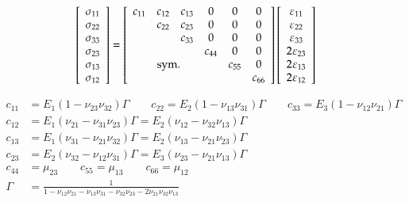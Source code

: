 \begin{align}
  \left[\begin{array}{c}
      \sigma_{11}\\
      \sigma_{22}\\
      \sigma_{33}\\
      \sigma_{23}\\
      \sigma_{13}\\
      \sigma_{12}\\
    \end{array}\right]
  &= \left[
    \begin{array}{cccccc}
      c_{11} & c_{12} & c_{13} &   0   &   0   &   0  \\
            & c_{22} & c_{23} &   0   &   0   &   0  \\
            &       & c_{33} &   0   &   0   &   0  \\
            &       &       & c_{44} &   0   &   0  \\
            &  \multicolumn{2}{l}{\text{sym.}}       &       & c_{55} &   0  \\
            &       &       &       &       & c_{66}\\
    \end{array}\right]
  \left[\begin{array}{c}
      \varepsilon_{11}\\
      \varepsilon_{22}\\
      \varepsilon_{33}\\
      2\varepsilon_{23}\\
      2\varepsilon_{13}\\
      2\varepsilon_{12}\\
    \end{array}\right]
\end{align}

\begin{align}
  c_{11} &= E_1 (1 - \nu_{23}\nu_{32})\Gamma \qquad c_{22} = E_2 (1 - \nu_{13}\nu_{31})\Gamma \qquad c_{33} = E_3 (1 - \nu_{12}\nu_{21})\Gamma\\
  c_{12} &= E_1 (\nu_{21} - \nu_{31}\nu_{23})\Gamma = E_2 (\nu_{12} - \nu_{32}\nu_{13})\Gamma\\
  c_{13} &= E_1 (\nu_{31} - \nu_{21}\nu_{32})\Gamma = E_2 (\nu_{13} - \nu_{21}\nu_{23})\Gamma\\
  c_{23} &= E_2 (\nu_{32} - \nu_{12}\nu_{31})\Gamma = E_3 (\nu_{23} - \nu_{21}\nu_{13})\Gamma\\
  c_{44} &= \mu_{23} \qquad  c_{55} = \mu_{13} \qquad  c_{66} = \mu_{12} \\
  \Gamma &= \frac{1}{1 - \nu_{12} \nu_{21} - \nu_{13} \nu_{31} - \nu_{32} \nu_{23} - 2 \nu_{21} \nu_{32} \nu_{13}}
\end{align}

